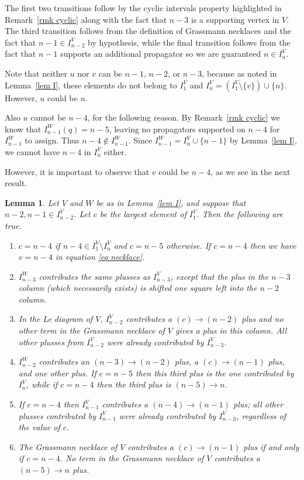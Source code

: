 \documentclass[11pt]{article}
\newtheorem{lem}[thm]{Lemma}
\theoremstyle{remark}
\theoremstyle{definition}
\begin{document}
The first two transitions follow by the cyclic intervals property highlighted in Remark~\ref{rmk cyclic} along with the fact that $n-3$ is a supporting vertex in $V$.  The third transition follows from the definition of Grassmann necklaces and the fact that $n-1\in I_{n-2}^V$ by hypothesis, while the final transition follows from the fact that $n-1$ supports an additional propagator so we are guaranteed $n \in I_n^V$.

Note that neither $u$ nor $v$ can be $n-1$, $n-2$, or $n-3$, because as noted in Lemma~\ref{lem I}, these elements do not belong to $I_1^V$ and $I_n^V = (I_1^V\setminus \{v\}) \cup \{n\}$. However, $u$ could be $n$.  

Also $u$ cannot be $n-4$, for the following reason. By Remark~\ref{rmk cyclic} we know that ${I_{n-1}^W(q) = n-5}$, leaving no propagators supported on $n-4$ for $I_{n-1}^W$ to assign. Thus $n-4 \not\in I_{n-1}^W$. Since ${I_{n-1}^W = I_n^V\cup\{n-1\}}$ by Lemma~\ref{lem I}, we cannot have $n-4$ in $I_n^V$ either.

However, it is important to observe that $v$ could be $n-4$, as we see in the next result. 


  \begin{lem}\label{lem n-2 bad}
    Let $V$ and $W$ be as in Lemma~\ref{lem I}, and suppose that $n-2,n-1 \in I_{n-2}^{V}$. Let $c$ be the largest element of $I_1^V$.  Then the following are true.
    \begin{enumerate}
  \item $c=n-4$ if $n-4\in I_1^V\setminus I_n^V$ and $c=n-5$ otherwise. If $c = n-4$ then we have $v = n-4$ in equation \eqref{eq necklace}.
  \item $I_{n-3}^W$ contributes the same plusses as $I_{n-3}^V$, except that the plus in the $n-3$ column (which necessarily exists) is shifted one square left into the $n-2$ column.
  \item In the Le diagram of $V$, $I_{n-2}^{V}$ contributes a $(c)\rightarrow (n-2)$ plus and no other term in the Grassmann necklace of $V$ gives a plus in this column. All other plusses from $I_{n-2}^{V}$ were already contributed by $I_{n-3}^V$.
  \item $I_{n-2}^W$ contributes an $(n-3) \rightarrow (n-2)$ plus, a $(c) \rightarrow (n-1)$ plus, and one other plus. If $c = n-5$ then this third plus is the one contributed by $I_n^V$, while if $c = n-4$ then the third plus is $(n-5) \rightarrow n$.
  \item If $c = n-4$ then $I_{n-1}^V$ contributes a $(n-4) \rightarrow (n-1)$ plus; all other plusses contributed by $I_{n-1}^V$ were already contributed by $I_{n-3}^V$, regardless of the value of $c$.
  \item The Grassmann necklace of $V$ contributes a $(c)\rightarrow (n-1)$ plus if and only if $c = n-4$. No term in the Grassmann necklace of $V$ contributes a $(n-5) \rightarrow n$ plus.
    \end{enumerate} 
\end{lem}
\end{document}
